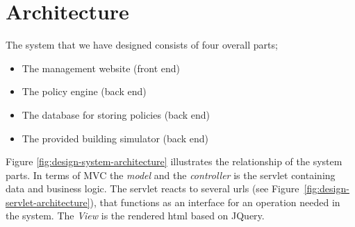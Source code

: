 \section{Architecture}
The system that we have designed consists of four overall parts;
\begin{itemize}
	\item The management website (front end)
	\item The policy engine (back end)
	\item The database for storing policies (back end)
	\item The provided building simulator (back end)
\end{itemize}

Figure \ref{fig:design-system-architecture} illustrates the relationship of the system parts. In terms of MVC the \textit{model} and the \textit{controller} is the servlet containing data and business logic. The servlet reacts to several urls (see Figure~\ref{fig:design-servlet-architecture}), that functions as an interface for an operation needed in the system. The \textit{View} is the rendered html based on JQuery.

\begin{figure}[t]
\end{figure}

